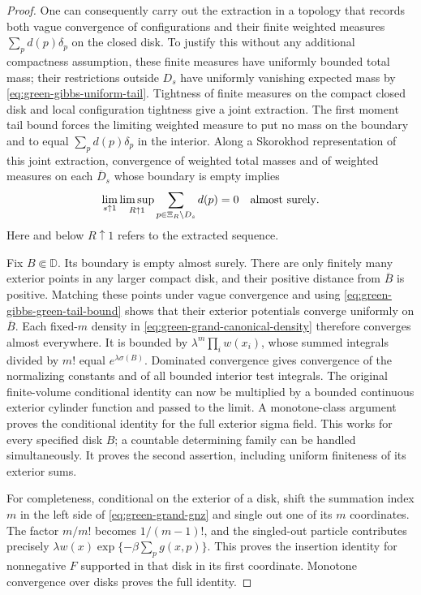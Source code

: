 \documentclass[11pt,a4paper]{article}
\numberwithin{equation}{section}
\theoremstyle{definition}
\theoremstyle{remark}
\newcommand{\D}{\mathbb D}
\begin{document}
\begin{proof}
One can consequently carry out the extraction in a topology that records
both vague convergence of configurations and their finite weighted measures
$\sum_pd(p)\delta_p$ on the closed disk.  To justify this without any
additional compactness assumption, these finite measures have uniformly
bounded total mass; their restrictions outside $D_s$ have uniformly
vanishing expected mass by \eqref{eq:green-gibbs-uniform-tail}.  Tightness
of finite measures on the compact closed disk and local configuration
tightness give a joint extraction.  The first moment tail bound forces
the limiting weighted measure to put no mass on the boundary and to equal
$\sum_pd(p)\delta_p$ in the interior.  Along a Skorokhod representation
of this joint extraction, convergence of weighted total masses and of
weighted measures on each $\overline D_s$ whose boundary is empty implies
\[
 \lim_{s\uparrow1}\limsup_{R\uparrow1}
       \sum_{p\in\Xi_R\setminus D_s}d(p)=0
 \quad\hbox{almost surely}.
\]
Here and below $R\uparrow1$ refers to the extracted sequence.

Fix $B\Subset\D$.  Its boundary is empty almost surely.  There are only
finitely many exterior points in any larger compact disk, and their
positive distance from $\overline B$ is positive.  Matching these points
under vague convergence and using
\eqref{eq:green-gibbs-green-tail-bound} shows that their exterior potentials
converge uniformly on $\overline B$.  Each fixed-$m$ density in
\eqref{eq:green-grand-canonical-density} therefore converges almost
everywhere.  It is bounded by $\lambda^m\prod_iw(x_i)$, whose summed
integrals divided by $m!$ equal $e^{\lambda\sigma(B)}$.  Dominated
convergence gives convergence of the normalizing constants and of all
bounded interior test integrals.  The original finite-volume conditional
identity can now be multiplied by a bounded continuous exterior cylinder
function and passed to the limit.  A monotone-class argument proves the
conditional identity for the full exterior sigma field.  This works for
every specified disk $B$; a countable determining family can be handled
simultaneously.  It proves the second assertion, including uniform
finiteness of its exterior sums.

For completeness, conditional on the exterior of a disk, shift the
summation index $m$ in the left side of
\eqref{eq:green-grand-gnz} and single out one of its $m$ coordinates.
The factor $m/m!$ becomes $1/(m-1)!$, and the singled-out particle
contributes precisely
$\lambda w(x)\exp\{-\beta\sum_pg(x,p)\}$.  This proves the insertion
identity for nonnegative $F$ supported in that disk in its first
coordinate.  Monotone convergence over disks proves the full identity.


\end{proof}
\end{document}

